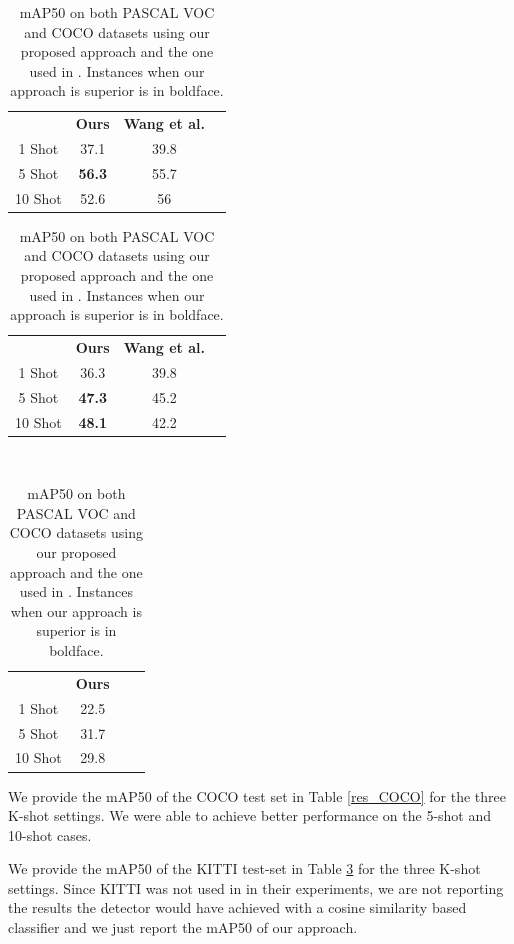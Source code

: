 \documentclass{article}
\begin{document}
\begin{table}[h!]
\centering
\begin{minipage}{0.35\textwidth}
\begin{tabular}{|c|c|c|c} 
\cline{1-3}
        & \bf Ours & \bf Wang et al. &   \\ 
\cline{1-3}
1 Shot  & 37.1         & 39.8        &   \\ 
\cline{1-3}
5 Shot  & \bf56.3         & 55.7        &   \\ 
\cline{1-3}
10 Shot & 52.6         & 56          &   \\
\cline{1-3}
\end{tabular}
\label{res_VOC}
\end{minipage}
%
\begin{minipage}{0.35\textwidth}
\begin{tabular}{|c|c|c|c} 
\cline{1-3}
        & \bf Ours & \bf Wang et al. &   \\ 
\cline{1-3}
1 Shot  & 36.3         & 39.8        &   \\ 
\cline{1-3}
5 Shot  & \bf 47.3         & 45.2        &   \\ 
\cline{1-3}
10 Shot & \bf 48.1         & 42.2        &   \\
\cline{1-3}
\end{tabular}
\label{res_COCO}
\end{minipage}
~~~~
\begin{minipage}{0.2\textwidth}
\begin{tabular}{|c|c|cc} 
\cline{1-2}
        & \bf Ours &  &   \\ 
\cline{1-2}
1 Shot  & 22.5         &  &   \\ 
\cline{1-2}
5 Shot  & 31.7         &  &   \\ 
\cline{1-2}
10 Shot & 29.8         &  &   \\
\cline{1-2}
\end{tabular}
\label{res_KITTI}
\end{minipage}
\caption{mAP50 on both PASCAL VOC and COCO datasets using our proposed approach and the one used 
in \cite{wang2020frustratingly}. Instances when our approach is superior is in boldface. }
\end{table} 

We provide the mAP50 of the COCO test set in Table \ref{res_COCO} for the three K-shot settings. We were able to achieve better performance on the 5-shot and 10-shot cases.

We provide the mAP50 of the KITTI test-set in Table \ref{res_KITTI} for the three K-shot settings. Since KITTI was not used in \cite{wang2020frustratingly} in their experiments, we are not reporting the results the detector would have achieved with a cosine similarity based classifier and we just report the mAP50 of our approach. 
\end{document}
